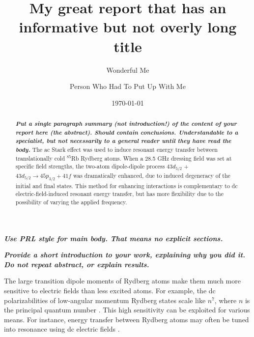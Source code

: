 \documentclass[letterpaper,twocolumn,showpacs,preprintnumbers,amsmath,amssymb,prl,nolongbibliography]{revtex4-2}
\begin{document}
\preprint{}

\title{My great report that has an informative but not overly long title}


\author{Wonderful Me}
\author{Person Who Had To Put Up With Me}
%

\date{\today}%

\begin{abstract}
\textbf{\emph{Put a single paragraph summary (not introduction!) of the content of your report here (the abstract).  Should contain conclusions.  Understandable to a specialist, but not necessarily to a general reader until they have read the body.}}
The ac Stark effect was used to induce resonant energy transfer
between translationally cold $^{85}$Rb Rydberg atoms.  When a 28.5 GHz
dressing field was set at specific field strengths, the two-atom
dipole-dipole process $43d_{5/2}$ + $43d_{5/2} \rightarrow
45p_{3/2}+41f$ was dramatically enhanced, due to induced degeneracy of
the initial and final states.  This method for enhancing interactions
is complementary to dc electric-field-induced resonant energy
transfer, but has more flexibility due to the possibility of varying
the applied frequency.
\end{abstract}

\maketitle

\textbf{\emph{Use PRL style for main body.  That means no explicit sections.}}

\textbf{\emph{Provide a short introduction to your work, explaining why you did it.  Do not repeat abstract, or explain results.}}


The large transition dipole moments of Rydberg atoms make them much
more sensitive to electric fields than less excited atoms.
For example, the dc
polarizabilities of low-angular momentum Rydberg states scale like
$n^7$, where $n$ is the principal quantum number \cite{gallagher:1994}.
This high sensitivity can be exploited for various means.  For instance,
energy transfer between Rydberg atoms may often be
tuned into resonance using dc electric fields \cite{safinya:1981}.
\end{document}
